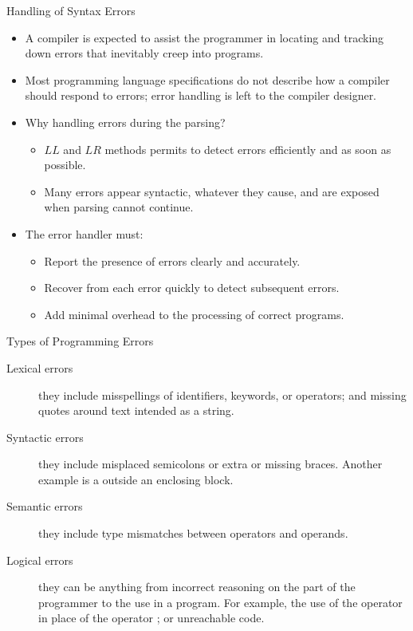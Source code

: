 \begin{bibunit}[apalike]
\begin{frame}{Handling of Syntax Errors}
	\begin{itemize}
	\item A compiler is expected to assist the programmer in locating and tracking down errors that inevitably creep into programs.
	\item Most programming language specifications do not describe how a compiler should respond to errors; error handling is left to the compiler designer.
	\vfill
	\item \alert{Why handling errors during the parsing?} \begin{itemize}
		\item $LL$ and $LR$ methods permits to detect errors efficiently and as soon as possible.
		\item Many errors appear syntactic, whatever they cause, and are exposed when parsing cannot continue.
		\end{itemize}
	\vfill
	\item \alert{The error handler must:} \begin{itemize}
		\item Report the presence of errors clearly and accurately.
		\item Recover from each error quickly to detect subsequent errors.
		\item Add minimal overhead to the processing of correct programs.
		\end{itemize}
	\end{itemize}
\end{frame}

\begin{frame}{Types of Programming Errors}
	\begin{description}
	\item[Lexical errors] they include misspellings of identifiers, keywords, or operators; and missing quotes around text intended as a string.
	\vfill
	\item[Syntactic errors] they include misplaced semicolons or extra or missing braces. Another example is a  outside an enclosing  block.
	\vfill
	\item[Semantic errors] they include type mismatches between operators and operands.
	\vfill
	\item[Logical errors] they can be anything from incorrect reasoning on the part of the programmer to the use in a program. For example, the use of the operator  in place of the operator ; or unreachable code.
	\end{description}
\end{frame}


\end{bibunit}
